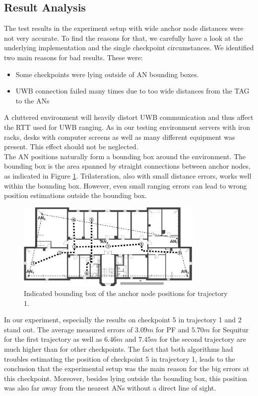\subsection{Result Analysis}
\label{Section2}
The test results in the experiment setup with wide anchor node distances were not very accurate. To find the reasons for that, we carefully have a look at the underlying implementation and the single checkpoint circumstances. We identified two main reasons for bad results. These were:
\begin{itemize}
\item Some checkpoints were lying outside of AN bounding boxes.
\item UWB connection failed many times due to too wide distances from the TAG to the ANs
\end{itemize}
A cluttered environment will heavily distort UWB communication and thus affect the RTT used for UWB ranging. As in our testing environment servers with iron racks, desks with computer screens as well as many different equipment was present. This effect should not be neglected.\\
\noindent\hspace*{5mm}%
The AN positions naturally form a bounding box around the environment. The bounding box is the area spanned by straight connections between anchor nodes, as indicated in Figure \ref{fig:trajectory1_boundingBox}. Trilateration, also with small distance errors, works well within the bounding box. However, even small ranging errors can lead to wrong position estimations outside the bounding box. 
\begin{figure}[th]
\centering
\includegraphics[width=0.8\textwidth]{Figures/trajectory1_boundingBox}
\decoRule
\caption[Bounding Box and Checkpoints for Trajectory 1 ]{Indicated bounding box of the anchor node positions for trajectory 1.}
\label{fig:trajectory1_boundingBox}
\end{figure}
In our experiment, especially the results on checkpoint 5 in trajectory 1 and 2 stand out. The average measured errors of $3.09m$ for PF and $5.70m$ for Sequitur for the first trajectory as well as $6.46m$ and $7.45m$ for the second trajectory are much higher than for other checkpoints. The fact that both algorithms had troubles estimating the position of checkpoint 5 in trajectory 1, leads to the conclusion that the experimental setup was the main reason for the big errors at this checkpoint. Moreover, besides lying outside the bounding box, this position was also far away from the nearest ANs without a direct line of sight.\\
